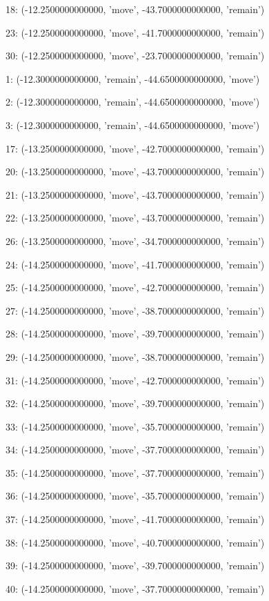 18: (-12.2500000000000, 'move', -43.7000000000000, 'remain')


23: (-12.2500000000000, 'move', -41.7000000000000, 'remain')


30: (-12.2500000000000, 'move', -23.7000000000000, 'remain')


1: (-12.3000000000000, 'remain', -44.6500000000000, 'move')


2: (-12.3000000000000, 'remain', -44.6500000000000, 'move')


3: (-12.3000000000000, 'remain', -44.6500000000000, 'move')


17: (-13.2500000000000, 'move', -42.7000000000000, 'remain')


20: (-13.2500000000000, 'move', -43.7000000000000, 'remain')


21: (-13.2500000000000, 'move', -43.7000000000000, 'remain')


22: (-13.2500000000000, 'move', -43.7000000000000, 'remain')


26: (-13.2500000000000, 'move', -34.7000000000000, 'remain')


24: (-14.2500000000000, 'move', -41.7000000000000, 'remain')


25: (-14.2500000000000, 'move', -42.7000000000000, 'remain')


27: (-14.2500000000000, 'move', -38.7000000000000, 'remain')


28: (-14.2500000000000, 'move', -39.7000000000000, 'remain')


29: (-14.2500000000000, 'move', -38.7000000000000, 'remain')


31: (-14.2500000000000, 'move', -42.7000000000000, 'remain')


32: (-14.2500000000000, 'move', -39.7000000000000, 'remain')


33: (-14.2500000000000, 'move', -35.7000000000000, 'remain')


34: (-14.2500000000000, 'move', -37.7000000000000, 'remain')


35: (-14.2500000000000, 'move', -37.7000000000000, 'remain')


36: (-14.2500000000000, 'move', -35.7000000000000, 'remain')


37: (-14.2500000000000, 'move', -41.7000000000000, 'remain')


38: (-14.2500000000000, 'move', -40.7000000000000, 'remain')


39: (-14.2500000000000, 'move', -39.7000000000000, 'remain')


40: (-14.2500000000000, 'move', -37.7000000000000, 'remain')


